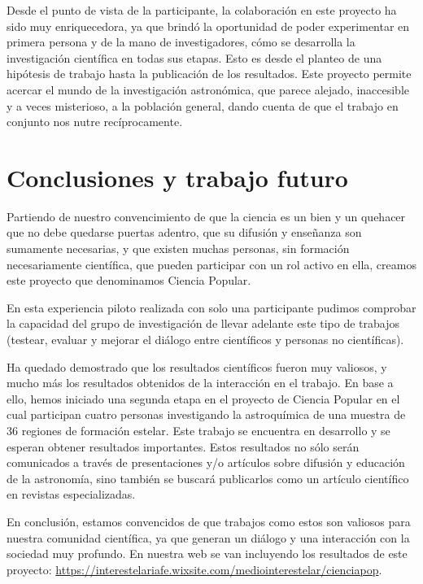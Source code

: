 \documentclass[baaa]{baaa}
\begin{document}
Desde el punto de vista de la participante, la colaboración en este proyecto ha sido muy enriquecedora, ya que brindó la oportunidad de poder experimentar en primera persona y de la mano de investigadores, cómo se desarrolla la investigación científica en todas sus etapas. Esto es desde el planteo de una hipótesis de trabajo hasta la publicación de los resultados. Este proyecto permite acercar el mundo de la investigación astronómica, que parece alejado, inaccesible y a veces misterioso, a la población general, dando cuenta de que el trabajo en conjunto nos nutre recíprocamente.

\section{Conclusiones y trabajo futuro}

Partiendo de nuestro convencimiento  de que la ciencia es un bien y un quehacer que no debe quedarse puertas adentro, que su difusión y enseñanza son sumamente necesarias, y que existen muchas personas, sin formación necesariamente científica, que pueden participar con un rol activo en ella, creamos este proyecto que denominamos Ciencia Popular. 

En esta experiencia piloto realizada con solo una participante pudimos comprobar la capacidad del grupo de investigación de llevar adelante este tipo de trabajos (testear, evaluar y mejorar el diálogo entre científicos y personas no científicas). 

Ha quedado demostrado que los resultados científicos fueron muy valiosos, y mucho más los resultados obtenidos de la interacción en el trabajo. En base a ello, hemos iniciado una segunda etapa en el proyecto de Ciencia Popular en el cual participan cuatro personas investigando la astroquímica de una muestra de 36 regiones de formación estelar. Este trabajo se encuentra en desarrollo y se esperan obtener resultados importantes. Estos resultados no sólo serán comunicados a través de presentaciones y/o artículos sobre difusión y educación de la astronomía, sino también se buscará publicarlos como un artículo científico en revistas especializadas. 

En conclusión, estamos convencidos de que trabajos como estos son valiosos para nuestra comunidad científica, ya que generan un diálogo y una interacción con la sociedad muy profundo. En nuestra web se van incluyendo los resultados de este proyecto: \url{https://interestelariafe.wixsite.com/mediointerestelar/cienciapop}.
\end{document}
